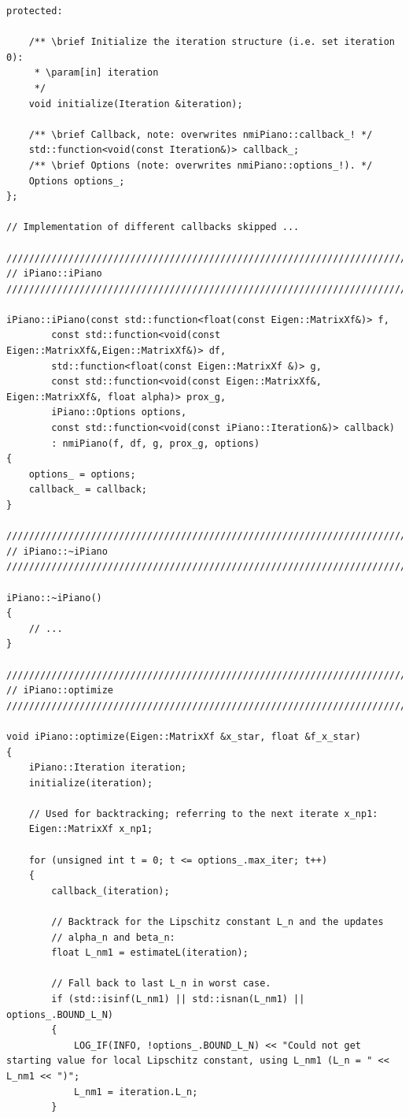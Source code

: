 \documentclass[onecolumn,final,a4paper,13pt,reqno]{siamart}
\begin{document}
\begin{appendix}
\begin{lstlisting}
protected:
    
    /** \brief Initialize the iteration structure (i.e. set iteration 0): 
     * \param[in] iteration
     */
    void initialize(Iteration &iteration);
    
    /** \brief Callback, note: overwrites nmiPiano::callback_! */
    std::function<void(const Iteration&)> callback_;
    /** \brief Options (note: overwrites nmiPiano::options_!). */
    Options options_;
};

// Implementation of different callbacks skipped ...

////////////////////////////////////////////////////////////////////////////////
// iPiano::iPiano
////////////////////////////////////////////////////////////////////////////////

iPiano::iPiano(const std::function<float(const Eigen::MatrixXf&)> f, 
        const std::function<void(const Eigen::MatrixXf&,Eigen::MatrixXf&)> df, 
        std::function<float(const Eigen::MatrixXf &)> g,
        const std::function<void(const Eigen::MatrixXf&, Eigen::MatrixXf&, float alpha)> prox_g,
        iPiano::Options options,
        const std::function<void(const iPiano::Iteration&)> callback)
        : nmiPiano(f, df, g, prox_g, options)
{
    options_ = options;
    callback_ = callback;
}

////////////////////////////////////////////////////////////////////////////////
// iPiano::~iPiano
////////////////////////////////////////////////////////////////////////////////

iPiano::~iPiano()
{
    // ...
}

////////////////////////////////////////////////////////////////////////////////
// iPiano::optimize
////////////////////////////////////////////////////////////////////////////////

void iPiano::optimize(Eigen::MatrixXf &x_star, float &f_x_star)
{
    iPiano::Iteration iteration;
    initialize(iteration);
    
    // Used for backtracking; referring to the next iterate x_np1:
    Eigen::MatrixXf x_np1;
    
    for (unsigned int t = 0; t <= options_.max_iter; t++)
    {
        callback_(iteration);
        
        // Backtrack for the Lipschitz constant L_n and the updates
        // alpha_n and beta_n:
        float L_nm1 = estimateL(iteration);
        
        // Fall back to last L_n in worst case.
        if (std::isinf(L_nm1) || std::isnan(L_nm1) || options_.BOUND_L_N)
        {
            LOG_IF(INFO, !options_.BOUND_L_N) << "Could not get starting value for local Lipschitz constant, using L_nm1 (L_n = " << L_nm1 << ")";
            L_nm1 = iteration.L_n;
        }
        

\end{lstlisting}
\end{appendix}
\end{document}
